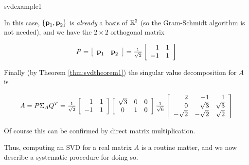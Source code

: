 \begin{example}{}{svdexample1}
\begin{solution}
\noindent In this case, $\{\textbf{p}_{1},\textbf{p}_{2}\}$ is \emph{already}
a basis of $\mathbb{R}^{2}$ (so the Gram-Schmidt algorithm is not needed),
and we have the $2\times 2$ orthogonal matrix 

\begin{equation*}
P=\left[ \begin{array}{cc} \textbf{p}_{1} & \textbf{p}_{2} \end{array}\right]=\tfrac{1}{\sqrt{2}}
\left[ 
\begin{array}{rr}
1 & 1 \\ 
-1 & 1
\end{array}
\right] 
\end{equation*}

\noindent Finally (by Theorem \ref{thm:svdtheorem1}) the singular value decomposition for $A$ is 

\begin{equation*}
A=P\Sigma_{A}Q^{T}=
\tfrac{1}{\sqrt{2}}\left[ 
\begin{array}{rr}
1 & 1 \\ 
-1 & 1
\end{array}
\right] \left[ 
\begin{array}{ccc}
\sqrt{3} & 0 & 0 \\ 
0 & 1 & 0
\end{array}
\right] \tfrac{1}{\sqrt{6}}\left[ 
\begin{array}{rrr}
2 & -1 & 1 \\ 
0 & \sqrt{3} & \sqrt{3} \\ 
-\sqrt{2} & -\sqrt{2} & \sqrt{2}
\end{array}
\right] 
\end{equation*}

\noindent Of course this can be confirmed by direct matrix multiplication.
\end{solution}
\end{example}

Thus, computing an SVD for a real matrix $A$ is a routine matter, and we now
describe a systematic procedure for doing so.


